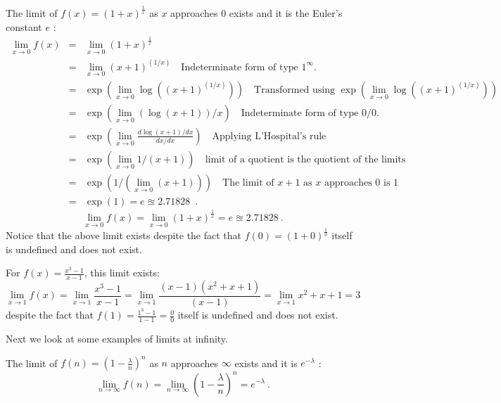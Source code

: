 \begin{example}\label{EX:LimitToE}
The limit of $f(x)=(1+x)^{\frac{1}{x}}$ as $x$ approaches $0$ exists and it is the Euler's constant $e$ :
\begin{eqnarray*}
\lim_{x \to 0} f(x)
&=& \lim_{x \to 0} (1+x)^{\frac{1}{x}}\\
&=& \lim_{x \to 0} (x+1)^{(1/x)} \quad \text{Indeterminate form of type $1^\infty$.}\\
&=& \exp\left(\lim_{x\to 0} \log((x+1)^{(1/x)})\right) \quad \text{Transformed using $\exp(\lim_{x\to 0} \log((x+1)^{(1/x)}))$} \\
&=& \exp\left(\lim_{x\to 0} (\log(x+1))/x\right) \quad \text{Indeterminate form of type $0/0$.}\\
&=& \exp\left( \lim_{x\to 0} \frac{ d\log(x+1)/ dx}{ dx/ dx} \right) \quad \text{Applying L'Hospital's rule} \\
&=&  \exp\left(\lim_{x\to 0} 1/(x+1)\right) \quad \text{limit of a quotient is the quotient of the limits}\\
&=&  \exp\left(1/(\lim_{x \to 0} (x+1))\right) \quad \text{The limit of $x+1$ as $x$ approaches $0$ is $1$}\\
&=& \exp(1)=e \approxeq 2.71828 \enspace .
\end{eqnarray*}
\[
\lim_{x \to 0} f(x) = \lim_{x \to 0} (1+x)^{\frac{1}{x}} = e \approxeq 2.71828 \ .
\]
Notice that the above limit exists despite the fact that $f(0) = (1+0)^{\frac{1}{0}}$ itself is undefined and does not exist.
\end{example}

\begin{example}
For $f(x)=\frac{x^3-1}{x-1}$, this limit exists:
\[
\lim_{x \to 1} f(x) = \lim_{x \to 1} \frac{x^3-1}{x-1}
=  \lim_{x \to 1} \frac{(x-1)(x^2+x+1)}{(x-1)}
= \lim_{x \to 1} x^2+x+1 = 3 \,
\]
despite the fact that $f(1)=\frac{1^3-1}{1-1}=\frac{0}{0}$ itself is undefined and does not exist.
\end{example}

Next we look at some examples of limits at infinity.
\begin{example}\label{EX:LimitExpofLambda}
The limit of $f(n)=\left( 1-\frac{\lambda}{n} \right)^n$ as $n$ approaches $\infty$ exists and it is $e^{-\lambda}$ :
\[
\lim_{n \to \infty} f(n) = \lim_{n \to \infty} \left( 1-\frac{\lambda}{n} \right)^n = e^{-\lambda} \ .
\]
\end{example}

